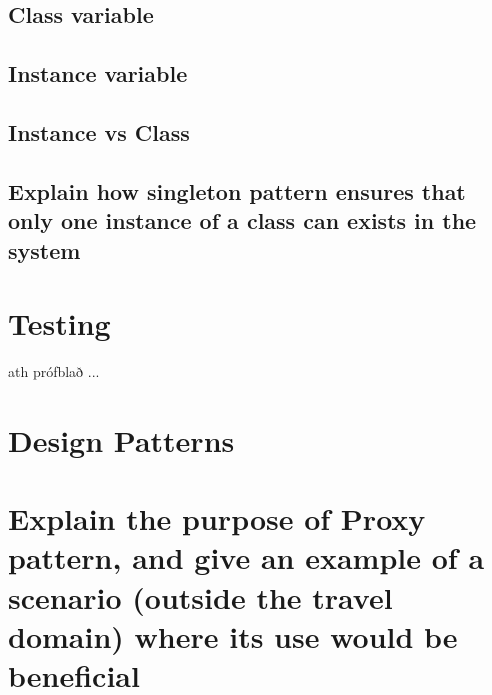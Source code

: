 \documentclass[]{article}
\begin{document}
\subsection{Class variable}
\subsection{Instance variable}
\subsection{Instance vs Class}
\subsection{Explain how singleton pattern ensures that only one instance of a class can exists in the system}

\section{Testing}
ath prófblað ...

\section{Design Patterns}
\section{Explain the purpose of Proxy pattern, and give an example of a scenario (outside the travel domain) where its use would be beneficial}
\end{document}
